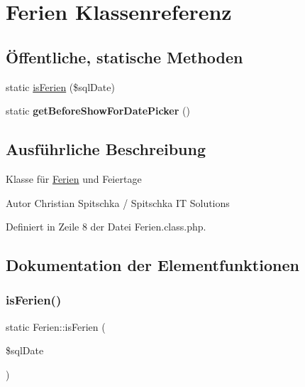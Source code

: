 \hypertarget{class_ferien}{}\section{Ferien Klassenreferenz}
\label{class_ferien}
\subsection*{Öffentliche, statische Methoden}
\begin{DoxyCompactItemize}
\item 
static \mbox{\hyperlink{class_ferien_a872ea30510b7706d003efe33b77da591}{is\+Ferien}} (\$sql\+Date)
\item 
\mbox{\label{class_ferien_a72bd26a848493527de41a8457491d2d2}} 
static {\bfseries get\+Before\+Show\+For\+Date\+Picker} ()
\end{DoxyCompactItemize}


\subsection{Ausführliche Beschreibung}
Klasse für \mbox{\hyperlink{class_ferien}{Ferien}} und Feiertage \begin{DoxyAuthor}{Autor}
Christian Spitschka / Spitschka IT Solutions 
\end{DoxyAuthor}


Definiert in Zeile 8 der Datei Ferien.\+class.\+php.



\subsection{Dokumentation der Elementfunktionen}
\mbox{\label{class_ferien_a872ea30510b7706d003efe33b77da591}} 
\subsubsection{\texorpdfstring{is\+Ferien()}{isFerien()}}
{\footnotesize\ttfamily static Ferien\+::is\+Ferien (\begin{DoxyParamCaption}\item[{}]{\$sql\+Date }\end{DoxyParamCaption})\hspace{0.3cm}{\ttfamily [static]}}

